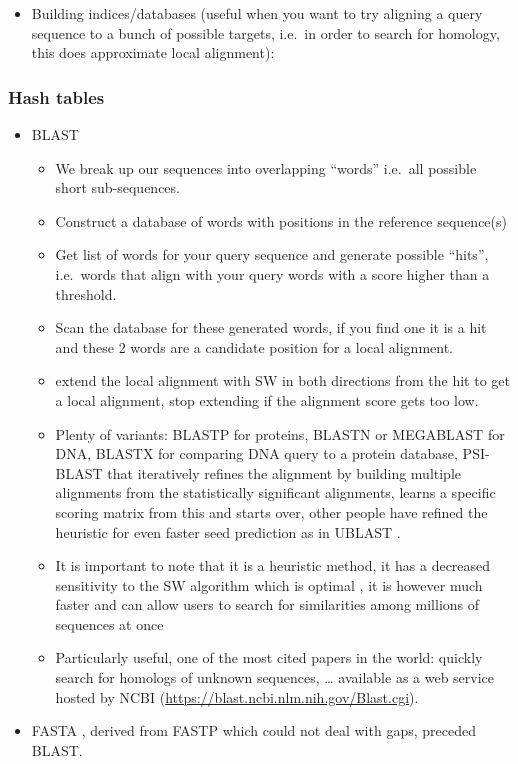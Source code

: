 \documentclass[
  11pt,
  twoside]{scrbook}
\providecommand{\tightlist}{%
  \setlength{\itemsep}{0pt}\setlength{\parskip}{0pt}}
\begin{document}
\begin{itemize}
\tightlist
\item
  Building indices/databases (useful when you want to try aligning a query sequence to a bunch of possible targets, i.e.~in order to search for homology, this does approximate local alignment):
\end{itemize}

\hypertarget{hash-tables}{%
\subsubsection{Hash tables}\label{hash-tables}}

\begin{itemize}
\item
  BLAST \autocite{altschulBasicLocalAlignment1990}

  \begin{itemize}
  \item
    We break up our sequences into overlapping ``words'' i.e.~all possible short sub-sequences.
  \item
    Construct a database of words with positions in the reference sequence(s)
  \item
    Get list of words for your query sequence and generate possible ``hits'', i.e.~words that align with your query words with a score higher than a threshold.
  \item
    Scan the database for these generated words, if you find one it is a hit and these 2 words are a candidate position for a local alignment.
  \item
    extend the local alignment with SW in both directions from the hit to get a local alignment, stop extending if the alignment score gets too low.
  \item
    Plenty of variants: BLASTP for proteins, BLASTN or MEGABLAST for DNA, BLASTX for comparing DNA query to a protein database, PSI-BLAST that iteratively refines the alignment by building multiple alignments from the statistically significant alignments, learns a specific scoring matrix from this and starts over, other people have refined the heuristic for even faster seed prediction as in UBLAST \autocite{edgarSearchClusteringOrders2010}.
  \item
    It is important to note that it is a heuristic method, it has a decreased sensitivity to the SW algorithm which is optimal \autocite{shpaerSensitivitySelectivityProtein1996}, it is however much faster and can allow users to search for similarities among millions of sequences at once
  \item
    Particularly useful, one of the most cited papers in the world: quickly search for homologs of unknown sequences, \ldots{} available as a web service hosted by NCBI (\url{https://blast.ncbi.nlm.nih.gov/Blast.cgi}).
  \end{itemize}
\item
  FASTA \autocite{pearsonImprovedToolsBiological1988}, derived from FASTP \autocite{lipmanRapidSensitiveProtein1985} which could not deal with gaps, preceded BLAST.


\end{itemize}
\end{document}
